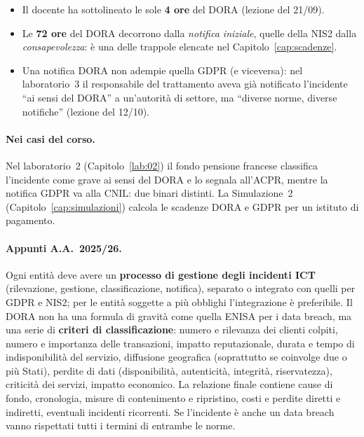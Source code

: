 \begin{esame}
\begin{itemize}
  \item Il docente ha sottolineato le sole \textbf{4 ore} del DORA (lezione del 21/09).
  \item Le \textbf{72 ore} del DORA decorrono dalla \emph{notifica iniziale}, quelle della NIS2 dalla
    \emph{consapevolezza}: è una delle trappole elencate nel Capitolo~\ref{cap:scadenze}.
  \item Una notifica DORA non adempie quella GDPR (e viceversa): nel laboratorio~3 il responsabile del
    trattamento aveva già notificato l'incidente ``ai sensi del DORA'' a un'autorità di settore, ma
    ``diverse norme, diverse notifiche'' (lezione del 12/10).
\end{itemize}
\end{esame}

\paragraph{Nei casi del corso.} Nel laboratorio~2 (Capitolo~\ref{lab:02}) il fondo pensione francese
classifica l'incidente come grave ai sensi del DORA e lo segnala all'ACPR, mentre la notifica GDPR va
alla CNIL: due binari distinti. La Simulazione~2 (Capitolo~\ref{cap:simulazioni}) calcola le scadenze
DORA e GDPR per un istituto di pagamento.

\paragraph{Appunti A.A.~2025/26.} Ogni entità deve avere un \textbf{processo di gestione degli incidenti
ICT} (rilevazione, gestione, classificazione, notifica), separato o integrato con quelli per GDPR e
NIS2; per le entità soggette a più obblighi l'integrazione è preferibile. Il DORA non ha una formula di
gravità come quella ENISA per i data breach, ma una serie di \textbf{criteri di classificazione}: numero
e rilevanza dei clienti colpiti, numero e importanza delle transazioni, impatto reputazionale, durata e
tempo di indisponibilità del servizio, diffusione geografica (soprattutto se coinvolge due o più Stati),
perdite di dati (disponibilità, autenticità, integrità, riservatezza), criticità dei servizi, impatto
economico. La relazione finale contiene cause di fondo, cronologia, misure di contenimento e ripristino,
costi e perdite diretti e indiretti, eventuali incidenti ricorrenti. Se l'incidente è anche un data
breach vanno rispettati tutti i termini di entrambe le norme.

